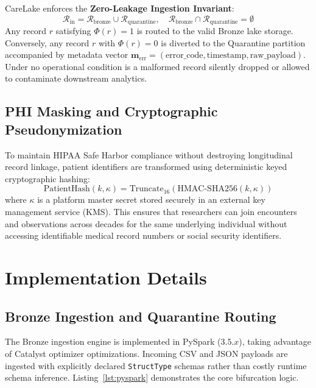 \documentclass[10pt,journal,compsoc]{IEEEtran}
\begin{document}
CareLake enforces the \textbf{Zero-Leakage Ingestion Invariant}:
\begin{equation}
\mathcal{R}_{\text{in}} = \mathcal{R}_{\text{bronze}} \cup \mathcal{R}_{\text{quarantine}}, \quad \mathcal{R}_{\text{bronze}} \cap \mathcal{R}_{\text{quarantine}} = \emptyset
\end{equation}
Any record $r$ satisfying $\Phi(r) = 1$ is routed to the valid Bronze lake storage. Conversely, any record $r$ with $\Phi(r) = 0$ is diverted to the Quarantine partition accompanied by metadata vector $\mathbf{m}_{\text{err}} = (\text{error\_code}, \text{timestamp}, \text{raw\_payload})$. Under no operational condition is a malformed record silently dropped or allowed to contaminate downstream analytics.

\subsection{PHI Masking and Cryptographic Pseudonymization}
To maintain HIPAA Safe Harbor compliance without destroying longitudinal record linkage, patient identifiers are transformed using deterministic keyed cryptographic hashing:
\begin{equation}
\text{PatientHash}(k, \kappa) = \text{Truncate}_{16}(\text{HMAC-SHA256}(k, \kappa))
\end{equation}
where $\kappa$ is a platform master secret stored securely in an external key management service (KMS). This ensures that researchers can join encounters and observations across decades for the same underlying individual without accessing identifiable medical record numbers or social security identifiers.

\section{Implementation Details}
\subsection{Bronze Ingestion and Quarantine Routing}
The Bronze ingestion engine is implemented in PySpark ($3.5.x$), taking advantage of Catalyst optimizer optimizations. Incoming CSV and JSON payloads are ingested with explicitly declared \texttt{StructType} schemas rather than costly runtime schema inference.
Listing~\ref{lst:pyspark} demonstrates the core bifurcation logic.
\end{document}
